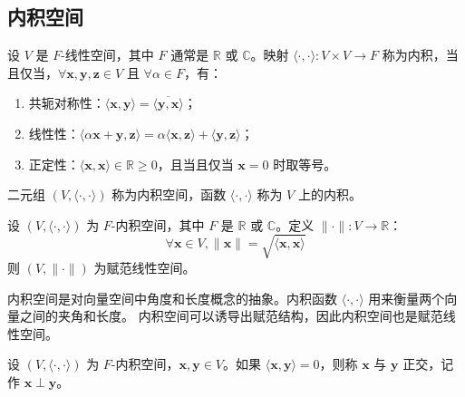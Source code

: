 
\vspace{1em}
\subsection{内积空间}

\begin{definition}
    设 $ V $ 是 $F$-线性空间，其中 $F$ 通常是 $\mathbb{R}$ 或 $\mathbb{C}$。映射 $ \langle\cdot,\cdot\rangle:V\times V\to F $ 称为内积，当且仅当，$ \forall \mathbf{x},\mathbf{y},\mathbf{z}\in V $ 且 $ \forall \alpha\in F $，有：
    \begin{enumerate}
        \item 共轭对称性：$ \langle \mathbf{x},\mathbf{y}\rangle=\overline{\langle \mathbf{y},\mathbf{x}\rangle} $；
        \item 线性性：$ \langle \alpha \mathbf{x}+\mathbf{y},\mathbf{z}\rangle=\alpha\langle \mathbf{x},\mathbf{z}\rangle+\langle \mathbf{y},\mathbf{z}\rangle $；
        \item 正定性：$ \langle \mathbf{x},\mathbf{x}\rangle \in \mathbb{R} \geq 0 $，且当且仅当 $ \mathbf{x}=0 $ 时取等号。
    \end{enumerate}
    二元组 $ (V,\langle\cdot,\cdot\rangle) $ 称为内积空间，函数 $ \langle\cdot,\cdot\rangle $ 称为 $ V $ 上的内积。
    \label{def:inner_product_space}
\end{definition}

\begin{proposition}[内积空间诱导的赋范线性空间]
    设 $ (V,\langle\cdot,\cdot\rangle) $ 为 $F$-内积空间，其中 $F$ 是 $\mathbb{R}$ 或 $\mathbb{C}$。定义 $ \|\cdot\|:V\to \mathbb{R} $：
    \[
        \forall \mathbf{x}\in V, \|\mathbf{x}\|=\sqrt{\langle \mathbf{x},\mathbf{x}\rangle}
    \]
    则 $ (V,\|\cdot\|) $ 为赋范线性空间。
\end{proposition}

\begin{note}
    内积空间是对向量空间中角度和长度概念的抽象。内积函数 $ \langle\cdot,\cdot\rangle $ 用来衡量两个向量之间的夹角和长度。
    内积空间可以诱导出赋范结构，因此内积空间也是赋范线性空间。
\end{note}

\begin{definition}[正交 Orthogonality]
    设 $ (V,\langle\cdot,\cdot\rangle) $ 为 $F$-内积空间，$ \mathbf{x},\mathbf{y}\in V $。如果 $ \langle \mathbf{x},\mathbf{y}\rangle=0 $，则称 $ \mathbf{x} $ 与 $ \mathbf{y} $ 正交，记作 $ \mathbf{x}\perp \mathbf{y} $。
    \label{def:orthogonality}
\end{definition}

\newpage